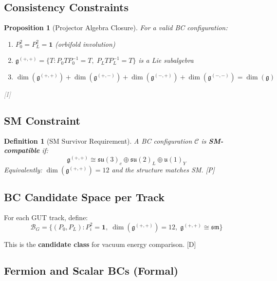 \documentclass[11pt,a4paper]{article}
\newtheorem{proposition}[theorem]{Proposition}
\newtheorem{definition}[theorem]{Definition}
\newcommand{\tagD}{\textcolor{blue!70!black}{[D]}}
\newcommand{\tagP}{\textcolor{green!50!black}{[P]}}
\newcommand{\tagI}{\textcolor{gray}{[I]}}
\begin{document}
\subsection{Consistency Constraints}

\begin{proposition}[Projector Algebra Closure]
\label{prop:closure}
For a valid BC configuration:
\begin{enumerate}
    \item $P_0^2 = P_L^2 = \mathbf{1}$ (orbifold involution)
    \item $\mathfrak{g}^{(+,+)} = \{T : P_0 T P_0^{-1} = T,\; P_L T P_L^{-1} = T\}$ is a Lie subalgebra
    \item $\dim(\mathfrak{g}^{(+,+)}) + \dim(\mathfrak{g}^{(+,-)}) + \dim(\mathfrak{g}^{(-,+)}) + \dim(\mathfrak{g}^{(-,-)}) = \dim(\mathfrak{g})$
\end{enumerate}
\tagI
\end{proposition}

\subsection{SM Constraint}

\begin{definition}[SM Survivor Requirement]
\label{def:sm-req}
A BC configuration $\mathcal{C}$ is \textbf{SM-compatible} if:
\begin{equation}
\label{eq:sm-compatible}
\mathfrak{g}^{(+,+)} \cong \mathfrak{su}(3)_c \oplus \mathfrak{su}(2)_L \oplus \mathfrak{u}(1)_Y
\end{equation}
Equivalently: $\dim(\mathfrak{g}^{(+,+)}) = 12$ and the structure matches SM. \tagP
\end{definition}

\subsection{BC Candidate Space per Track}

For each GUT track, define:
\begin{equation}
\label{eq:bc-candidate}
\mathcal{B}_G = \{(P_0, P_L) : P_i^2 = \mathbf{1},\; \dim(\mathfrak{g}^{(+,+)}) = 12,\; \mathfrak{g}^{(+,+)} \cong \mathfrak{sm}\}
\end{equation}

This is the \textbf{candidate class} for vacuum energy comparison. \tagD

\subsection{Fermion and Scalar BCs (Formal)}
\end{document}

